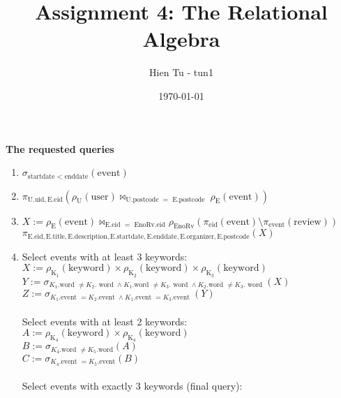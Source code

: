 \documentclass{article}
\title{Assignment 4: The Relational Algebra}
\author{Hien Tu - tun1}
\date{\today}
\newcommand{\GETS}{:=}
\newcommand{\rename}{\rho}
\newcommand{\select}{\sigma}
\newcommand{\rel}[1]{\text{#1}}
\newcommand{\attr}[1]{\text{#1}}
\newcommand{\ra}[2]{\rel{#1}.\attr{#2}}
\newcommand{\project}{\pi}
\newcommand{\product}{\times}
\newcommand{\difference}{\setminus}
\begin{document}
\maketitle

\textbf{The requested queries}
\begin{enumerate}
  \item $\select_{\attr{startdate } < \attr{ enddate}}(\rel{event})$ \\
  \item $\project_{\ra{U}{uid}, \ra{E}{eid}}
          (\rename_{\rel{U}}(\rel{user}) \Join_{\ra{U}{postcode } = \ra{ E}{postcode }}
          \rename_{\rel{E}}(\rel{event}))$ \\
  \item $X \GETS
          \rename_{\rel{E}}(\rel{event}) \Join_{\ra{E}{eid } = \ra{ EnoRv}{eid}}
          \rename_{\rel{EnoRv}}
            (\project_{\attr{eid}}(\rel{event}) \difference
            \project_{\attr{event}}(\rel{review}))$ \\
        $\project_{\ra{E}{eid}, \ra{E}{title}, \ra{E}{description},
          \ra{E}{startdate}, \ra{E}{enddate}, \ra{E}{organizer},
          \ra{E}{postcode}}(X)$ \\
  \item Select events with at least 3 keywords: \\
        $X \GETS \rename_{\rel{K}_1}(\attr{keyword}) \product
                  \rename_{\rel{K}_2}(\attr{keyword}) \product
                  \rename_{\rel{K}_3}(\attr{keyword})$ \\
        $Y \GETS \select_{K_1.\attr{word } \neq K_2.\attr{ word } \land
                          K_1.\attr{word } \neq K_3.\attr{ word } \land
                          K_2.\attr{word } \neq K_3.\attr{ word }}(X)$ \\
        $Z \GETS \select_{K_1.\attr{event } = K_2.\attr{event } \land
                          K_1.\attr{event } = K_3.\attr{event }}(Y)$ \\ \\
        Select events with at least 2 keywords: \\
        $A \GETS \rename_{\rel{K}_4}(\attr{keyword}) \product
                  \rename_{\rel{K}_4}(\attr{keyword})$ \\
        $B \GETS \select_{K_4.\attr{word } \neq K_5.\attr{word}}(A)$ \\
        $C \GETS \select_{K_4.\attr{event } = K_5.\attr{event}}(B)$ \\ \\
        Select events with exactly 3 keywords (final query): \\

\end{enumerate}
\end{document}
